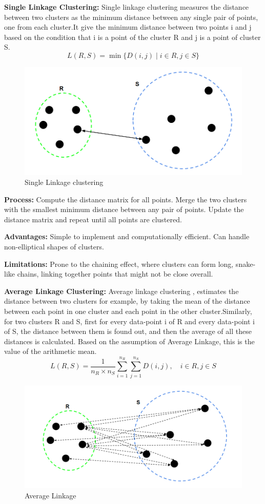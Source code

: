 \documentclass[conference]{IEEEtran}
\begin{document}
\textbf{Single Linkage Clustering:} Single linkage clustering measures the distance between two clusters as the minimum distance between any single pair of points, one from each cluster.It give the minimum distance between two points i and j based on the condition that i is a point of the cluster R and j is a point of cluster S.
\begin{equation}
L(R,S) = \min \{ D(i,j) \mid i \in R, j \in S \}
\end{equation}
\begin{figure}
    \centering
    \includegraphics[width=0.6\linewidth]{single2.png}
    \caption{Single Linkage clustering\cite{Linkage}}
    \label{fig:enter-label}
\end{figure}

\textbf{Process:} Compute the distance matrix for all points.
Merge the two clusters with the smallest minimum distance between any pair of points. Update the distance matrix and repeat until all points are clustered.

\textbf{Advantages:} Simple to implement and computationally efficient.
Can handle non-elliptical shapes of clusters.

\textbf{Limitations:} Prone to the chaining effect, where clusters can form long, snake-like chains, linking together points that might not be close overall.

\textbf{Average Linkage Clustering:} Average linkage clustering , estimates the distance between two clusters for example, by taking the mean of the distance between each point in one cluster and each point in the other cluster.Similarly, for two clusters R and S, first for every data-point i of R and every data-point i of S, the distance between them is found out, and then the average of all these distances is calculated. Based on the assumption of Average Linkage, this is the value of the arithmetic mean.\cite{roux2018comparative}
\begin{equation}
L(R,S) = \frac{1}{n_R \times n_S} \sum_{i=1}^{n_R} \sum_{j=1}^{n_S} D(i,j), \quad i \in R, j \in S
\end{equation}
\begin{figure}
    \centering
    \includegraphics[width=0.6\linewidth]{average linkage.png}
    \caption{Average Linkage\cite{Linkage}}
    \label{fig:enter-label}
\end{figure}
\end{document}
